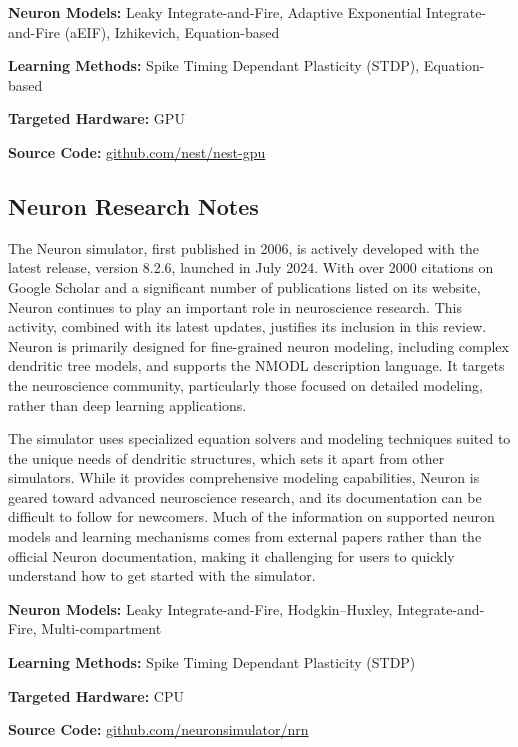 \begin{tcolorbox}[enhanced,attach boxed title to top center={yshift=-3mm,yshifttext=-1mm}, colback=blue!5!white,colframe=blue!75!black,colbacktitle=red!80!black, title=NEST GPU at a Glance,fonttitle=\bfseries, boxed title style={size=small,colframe=red!50!black} ]

\textbf{Neuron Models:} Leaky Integrate-and-Fire, Adaptive Exponential  Integrate-and-Fire (aEIF), Izhikevich, Equation-based

\textbf{Learning Methods:} Spike Timing Dependant Plasticity (STDP), Equation-based  

\textbf{Targeted Hardware:} GPU 

\textbf{Source Code:} \href{https://github.com/nest/nest-gpu}{github.com/nest/nest-gpu}
\end{tcolorbox}
\subsection*{Neuron Research Notes}\label{Neuron}

The Neuron simulator, first published in 2006, is actively developed with the latest release, version 8.2.6, launched in July 2024. With over 2000 citations on Google Scholar and a significant number of publications listed on its website, Neuron continues to play an important role in neuroscience research. This activity, combined with its latest updates, justifies its inclusion in this review. Neuron is primarily designed for fine-grained neuron modeling, including complex dendritic tree models, and supports the NMODL description language. It targets the neuroscience community, particularly those focused on detailed modeling, rather than deep learning applications.

The simulator uses specialized equation solvers and modeling techniques suited to the unique needs of dendritic structures, which sets it apart from other simulators. While it provides comprehensive modeling capabilities, Neuron is geared toward advanced neuroscience research, and its documentation can be difficult to follow for newcomers. Much of the information on supported neuron models and learning mechanisms comes from external papers rather than the official Neuron documentation, making it challenging for users to quickly understand how to get started with the simulator.

\begin{tcolorbox}[enhanced,attach boxed title to top center={yshift=-3mm,yshifttext=-1mm}, colback=blue!5!white,colframe=blue!75!black,colbacktitle=red!80!black, title=Neuron at a Glance,fonttitle=\bfseries, boxed title style={size=small,colframe=red!50!black} ]

\textbf{Neuron Models:} Leaky Integrate-and-Fire, Hodgkin–Huxley, Integrate-and-Fire, Multi-compartment

\textbf{Learning Methods:} Spike Timing Dependant Plasticity (STDP)  

\textbf{Targeted Hardware:} CPU 

\textbf{Source Code:} \href{https://github.com/neuronsimulator/nrn}{github.com/neuronsimulator/nrn}
\end{tcolorbox}
